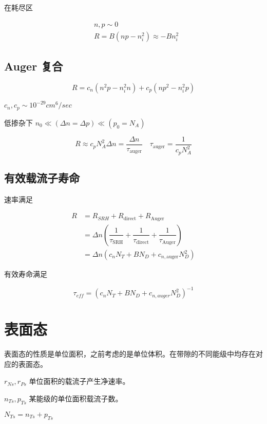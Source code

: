 \documentclass[cn,11pt,chinese,black,simple]{../elegantbook}
\begin{document}
在耗尽区

\[\begin{aligned}
    &n, p \sim 0\\
    &R=B\left(n p-n_{i}^{2}\right) \approx-B n_{i}^{2}
\end{aligned}\]

\subsection{Auger 复合}

\[R=c_{n}\left(n^{2} p-n_{i}^{2} n\right)+c_{p}\left(n p^{2}-n_{i}^{2} p\right)\]

\(c_{n}, c_{p} \sim 10^{-29} cm ^{6} / sec\)

低掺杂下
\(n_{0} \ll(\Delta n=\Delta p) \ll\left(p_{0}=N_{A}\right)\)

\[R \approx c_{p} N_{A}^{2} \Delta n=\dfrac{\Delta n}{\tau_{\text {auger}}} \quad \tau_{\text {auger}}=\dfrac{1}{c_{p} N_{A}^{2}}\]

\subsection{有效载流子寿命}



速率满足

\[
    \begin{aligned}
        R &=R_{S R H}+R_{\text {direct}}+R_{\text {Auger}} \\
        &=\Delta n\left(\dfrac{1}{\tau_{\text {SRH}}}+\dfrac{1}{\tau_{\text {direct}}}+\dfrac{1}{\tau_{\text {Auger}}}\right) \\
        &=\Delta n\left(c_{n} N_{T}+B N_{D}+c_{n, \text {auger}} N_{D}^{2}\right)
    \end{aligned}\]

有效寿命满足

\[\tau_{e f f}=\left(c_{n} N_{T}+B N_{D}+c_{n, a u g e r} N_{D}^{2}\right)^{-1}\]

\section{表面态}

表面态的性质是单位面积，之前考虑的是单位体积。在带隙的不同能级中均存在对应的表面态。

\(r_{Ns}, r_{Ps}\) 单位面积的载流子产生净速率。

\(n_{Ts}, p_{Ts}\) 某能级的单位面积载流子数。

\(N_{Ts} = n_{Ts} + p_{Ts}\)
\end{document}
